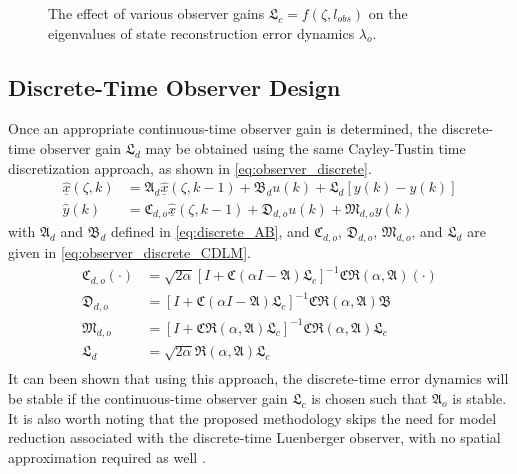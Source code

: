 \begin{figure}[!htbp]
    \centering
    
    \caption{The effect of various observer gains $\mathfrak{L}_c = f(\zeta, l_{obs})$ on the eigenvalues of state reconstruction error dynamics $\lambda_o$.}
    \label{fig:L_vs_lambda}
\end{figure}

\subsection{Discrete-Time Observer Design}
Once an appropriate continuous-time observer gain is determined, the discrete-time observer gain $\mathfrak{L}_d$ may be obtained using the same Cayley-Tustin time discretization approach, as shown in \eqref{eq:observer_discrete}.
\begin{equation} \label{eq:observer_discrete}
    \begin{aligned}
        \underline{\hat{x}}(\zeta, k) &= \mathfrak{A}_d \underline{\hat{x}}(\zeta, k-1) + \mathfrak{B}_d u(k) + \mathfrak{L}_d [y(k) - \hat{y}(k)] \\
        \hat{y}(k) &= \mathfrak{C}_{d,o} \underline{\hat{x}}(\zeta, k-1) + \mathfrak{D}_{d,o} u(k) + \mathfrak{M}_{d,o} y(k)
    \end{aligned}
\end{equation}
with $\mathfrak{A}_d$ and $\mathfrak{B}_d$ defined in \eqref{eq:discrete_AB}, and $\mathfrak{C}_{d,o}$, $\mathfrak{D}_{d,o}$, $\mathfrak{M}_{d,o}$, and $\mathfrak{L}_d$ are given in \eqref{eq:observer_discrete_CDLM}.
\begin{equation} \label{eq:observer_discrete_CDLM}
    \begin{aligned}
        \mathfrak{C}_{d,o} (\cdot) &= \sqrt{2\alpha} \left[ I + \mathfrak{C} (\alpha I - \mathfrak{A}) \mathfrak{L}_c \right]^{-1} \mathfrak{C} \mathfrak{R}(\alpha, \mathfrak{A}) (\cdot) \\
        \mathfrak{D}_{d,o} &= \left[ I + \mathfrak{C} (\alpha I - \mathfrak{A}) \mathfrak{L}_c \right]^{-1} \mathfrak{C} \mathfrak{R}(\alpha, \mathfrak{A}) \mathfrak{B} \\
        \mathfrak{M}_{d,o} &= \left[ I + \mathfrak{C} \mathfrak{R}(\alpha, \mathfrak{A}) \mathfrak{L}_c \right]^{-1} \mathfrak{C} \mathfrak{R}(\alpha, \mathfrak{A}) \mathfrak{L}_c \\
        \mathfrak{L}_d &= \sqrt{2\alpha} \mathfrak{R}(\alpha, \mathfrak{A}) \mathfrak{L}_c \\
    \end{aligned}
\end{equation}
It can been shown that using this approach, the discrete-time error dynamics will be stable if the continuous-time observer gain $\mathfrak{L}_c$ is chosen such that $\mathfrak{A}_o$ is stable. It is also worth noting that the proposed methodology skips the need for model reduction associated with the discrete-time Luenberger observer, with no spatial approximation required as well \cite{dochain2000state,dochain2001state,alonso2004optimal,Ali2015Review,Khatibi2021Model}.


